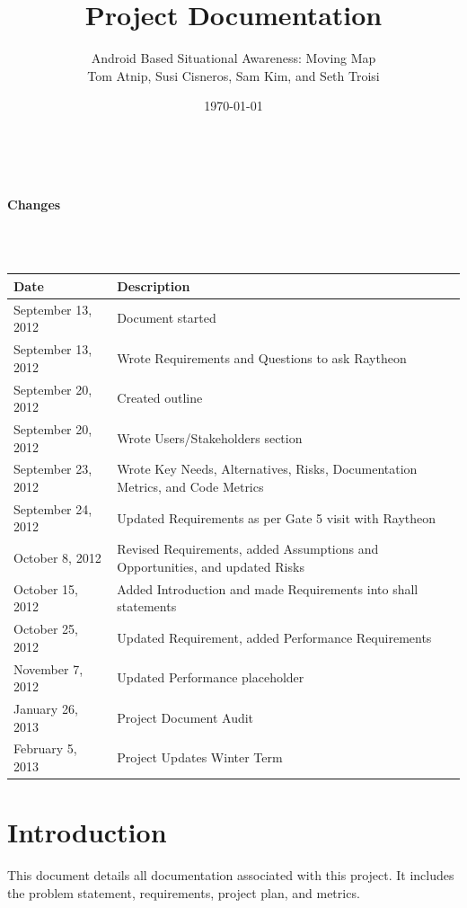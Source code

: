 \documentclass{article}
\begin{document}
\setlength{\voffset}{3.5in}
\title{Project Documentation}
\author{\Large Android Based Situational Awareness: Moving Map\\
Tom Atnip, Susi Cisneros, Sam Kim, and Seth Troisi}
\date{\today}
\maketitle
\clearpage
\setlength{\voffset}{0pt}
\tableofcontents
\clearpage
~\\
\begin{Large}\textbf{Changes}\end{Large}\\
~\\
\begin{tabular}{ | p{1.5in} | p{4.5in} | }
\hline
\textbf{Date} & \textbf{Description}\\
\hline
\hline
September 13, 2012 & Document started\\
\hline
September 13, 2012 & Wrote Requirements and Questions to ask Raytheon\\
\hline
September 20, 2012 & Created outline\\
\hline
September 20, 2012 & Wrote Users/Stakeholders section\\
\hline
September 23, 2012 & Wrote Key Needs, Alternatives, Risks, Documentation Metrics, and Code Metrics\\
\hline
September 24, 2012 & Updated Requirements as per Gate 5 visit with Raytheon\\
\hline
October 8, 2012 & Revised Requirements, added Assumptions and Opportunities, and updated Risks\\
\hline
October 15, 2012 & Added Introduction and made Requirements into shall statements\\
\hline
October 25, 2012 & Updated Requirement, added Performance Requirements\\
\hline
November 7, 2012 & Updated Performance placeholder\\
\hline
January 26, 2013 & Project Document Audit\\
\hline
February 5, 2013 & Project Updates Winter Term\\
\hline
\end{tabular}
\clearpage

\section{Introduction}
This document details all documentation associated with this project.  It includes the problem statement, requirements, project plan, and metrics.
\end{document}
